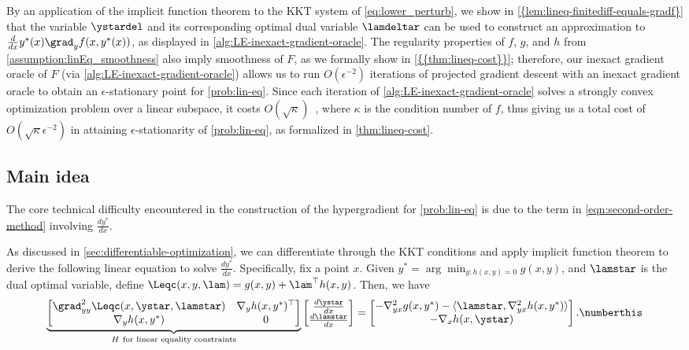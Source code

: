By an application of the implicit function theorem to the KKT system of \cref{eq:lower_perturb}, we show in \cref{{lem:lineq-finitediff-equals-gradf}} that the variable $\ystardel$  and its corresponding optimal dual variable $\lamdeltar$ can be used to construct an approximation to  $\frac{d}{dx}y^{*}(x)\grad_{y}f(x,y^{*}(x))$, as displayed in \cref{alg:LE-inexact-gradient-oracle}. 
The regularity properties of $f$, $g$, and $h$  from \cref{assumption:linEq_smoothness} also imply smoothness of $F$, as we formally show in \cref{{{thm:lineq-cost}}}; therefore, our inexact gradient oracle of $F$ (via \cref{alg:LE-inexact-gradient-oracle}) allows us to run  $O(\epsilon^{-2})$ iterations of projected gradient descent with an inexact gradient oracle to obtain an $\epsilon$-stationary point for \cref{prob:lin-eq}. Since each iteration of \cref{alg:LE-inexact-gradient-oracle} solves a strongly convex optimization problem over a linear subspace, it costs $O(\sqrt{\kappa})$~\cite{salim2022optimal}, where $\kappa$ is the condition number of $f$, thus giving us a total cost of $O(\sqrt{\kappa}\epsilon^{-2})$ in attaining $\epsilon$-stationarity of \cref{prob:lin-eq}, as formalized in \cref{thm:lineq-cost}.



\subsection{Main idea}\label{sec:warmup-lin-eq}

The core technical difficulty encountered in the construction of the hypergradient  for \cref{prob:lin-eq} is due to the term in \cref{eqn:second-order-method} involving $\frac{dy^*}{dx}$. 

As discussed in \cref{sec:differentiable-optimization}, we can differentiate through the KKT conditions and apply implicit function theorem to derive the following linear equation to solve $\frac{dy^*}{dx}$.
Specifically, fix a point $x$. Given $y^*= \arg\min_{y: h(x,y)=0} g(x,y)$, and $\lamstar$ is the dual optimal variable, define $\Leqc(x,y,\lam)=g(x,y)+\lam^\top h(x,y)$. Then, we have 
\[
\underbrace{\begin{bmatrix}\grad^2_{yy}\Leqc(x,\ystar,\lamstar) & \nabla_y h(x,y^{*})^{\top}\\
\nabla_y h(x,y^{*}) & 0
\end{bmatrix}}_{H ~\text{for linear equality constraints}}\begin{bmatrix}\frac{d\ystar}{dx}\\
\frac{d\lamstar}{dx}
\end{bmatrix}=\begin{bmatrix}-\nabla^2_{yx}g(x,y^{*})-\langle\lamstar, \nabla^2_{yx}h(x,y^{*})\rangle\\
-\nabla_x h(x,\ystar)\end{bmatrix}.\numberthis\label{eq:def_matrix_H}\]

